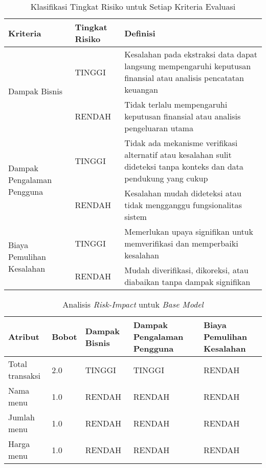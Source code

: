 \begin{table}[h!]
    \centering
    \caption{Klasifikasi Tingkat Risiko untuk Setiap Kriteria Evaluasi}
    \label{tab:risk-classification}
    \begin{tabular}{|m{3cm}|l|m{7.5cm}|}
        \hline
        \textbf{Kriteria} & \textbf{Tingkat Risiko} & \textbf{Definisi} \\ \hline
        
        \multirow{2}{=}{Dampak Bisnis} & TINGGI & Kesalahan pada ekstraksi data dapat langsung mempengaruhi keputusan finansial atau analisis pencatatan keuangan \\ \cline{2-3}
        & RENDAH & Tidak terlalu mempengaruhi keputusan finansial atau analisis pengeluaran utama \\ \hline
        
        \multirow{2}{=}{Dampak Pengalaman Pengguna} & TINGGI & Tidak ada mekanisme verifikasi alternatif atau kesalahan sulit dideteksi tanpa konteks dan data pendukung yang cukup \\ \cline{2-3}
        & RENDAH & Kesalahan mudah dideteksi atau tidak mengganggu fungsionalitas sistem \\ \hline
        \multirow{2}{=}{Biaya Pemulihan Kesalahan} & TINGGI & Memerlukan upaya signifikan untuk memverifikasi dan memperbaiki kesalahan \\ \cline{2-3}
        & RENDAH & Mudah diverifikasi, dikoreksi, atau diabaikan tanpa dampak signifikan \\ \hline
    \end{tabular}
\end{table}

\begin{table}[h!]
    \centering
    \caption{Analisis \emph{Risk-Impact} untuk \emph{Base Model}}
    \label{tab:risk-impact-base-model}
    \begin{tabularx}{\textwidth}{|p{3cm}|p{1cm}|p{2cm}|p{2.5cm}|X|}
        \hline
        \textbf{Atribut} & \textbf{Bobot} & \textbf{Dampak Bisnis} & \textbf{Dampak Pengalaman Pengguna} & \textbf{Biaya Pemulihan Kesalahan} \\ \hline
        Total transaksi & 2.0 & TINGGI & TINGGI & RENDAH \\ \hline
        Nama menu & 1.0 & RENDAH & RENDAH & RENDAH \\ \hline
        Jumlah menu & 1.0 & RENDAH & RENDAH & RENDAH \\ \hline
        Harga menu & 1.0 & RENDAH & RENDAH & RENDAH \\ \hline
    \end{tabularx}
\end{table}

